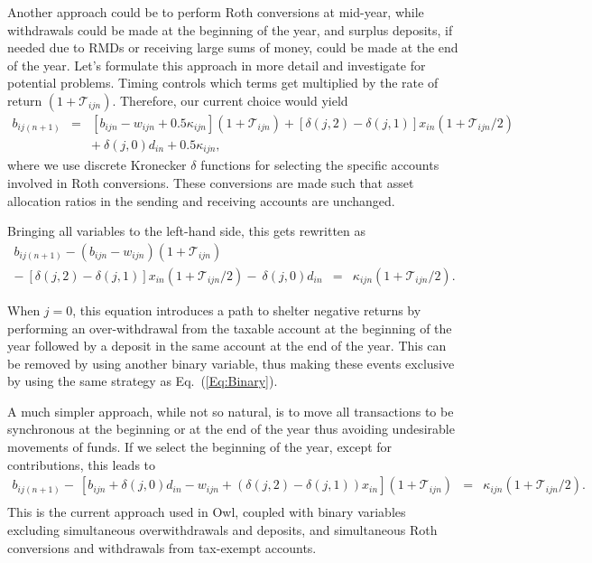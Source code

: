 \documentclass{report}[fleqn,11pt]
\begin{document}
	Another approach could be to perform Roth conversions at mid-year, while withdrawals
	could be made at the beginning of the year, and surplus deposits,
	if needed due to RMDs or receiving large sums of money,
	could be made at the end of the year. Let's formulate this approach
	in more detail and investigate for potential problems.
	Timing controls which terms get multiplied by the rate of return $(1 + \mathcal{T}_{ijn})$.
	Therefore, our current choice would yield
	\begin{eqnarray}
		\label{Eq:C3a}
		b_{ij(n+1)} &=& [b_{ijn} - w_{ijn} + 0.5\kappa_{ijn}](1 + \mathcal{T}_{ijn})
		+ [\delta(j, 2) - \delta(j, 1)]x_{in} (1 + \mathcal{T}_{ijn}/2)
		\nonumber \\
		&& 
		+\ \delta(j, 0) d_{in} + 0.5 \kappa_{ijn},
	\end{eqnarray}
	where we use discrete Kronecker $\delta$ functions for selecting the specific accounts involved
	in Roth conversions. These conversions are made such that asset allocation
	ratios in the sending and receiving accounts are unchanged.

	Bringing all variables
	to the left-hand side, this gets rewritten as
	\begin{eqnarray}
		\label{Eq:C3}
		b_{ij(n+1)} - (b_{ijn} - w_{ijn}) (1 + \mathcal{T}_{ijn})
		&& \nonumber \\
		-\ [\delta(j, 2) - \delta(j, 1)]x_{in}(1 + \mathcal{T}_{ijn}/2)
		-\ \delta(j, 0) d_{in}
		&=& \kappa_{ijn} (1 + \mathcal{T}_{ijn}/2).
	\end{eqnarray}

	When $j=0$, this equation introduces
	a path to shelter negative returns by performing an over-withdrawal from the taxable
	account at the beginning of the year followed by a deposit in the
	same account at the end of the year. This can 
	be removed by using another binary variable, thus making these events exclusive by using
	the same strategy as Eq.~(\ref{Eq:Binary}).

	A much simpler approach, while not so natural,
	is to move all transactions to be synchronous at the beginning or at the end of the year
	thus avoiding undesirable movements of funds.
	If we select the beginning of the year, except for contributions, this leads to
	\begin{eqnarray}
		\label{Eq:C3b}
		b_{ij(n+1)}
		- \ [b_{ijn} + \delta(j, 0)d_{in} - w_{ijn} + (\delta(j, 2) - \delta(j, 1))x_{in}]
		(1 + \mathcal{T}_{ijn})
		&=& \kappa_{ijn} (1 + \mathcal{T}_{ijn}/2).
		\nonumber \\
	\end{eqnarray}
This is the current approach used in Owl, coupled with
binary variables excluding simultaneous overwithdrawals and deposits, and
simultaneous Roth conversions and withdrawals from tax-exempt accounts.
\end{document}
